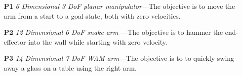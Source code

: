 \documentclass[letterpaper, 10 pt, conference]{ieeeconf}  %
\begin{document}
\begin{enumerate}
	\item[\textbf{P1}] \emph{6 Dimensional 3 DoF planar manipulator}---The objective is to move the arm from a start to a goal state, both with zero velocities.
	
	\item[\textbf{P2}] \emph{12 Dimensional 6 DoF snake arm}	---The objective is to hammer the end-effector into the wall while starting with zero velocity.

	\item[\textbf{P3}] \emph{14 Dimensional 7 DoF WAM arm}---The objective is to  to quickly swing away a glass on a table using the right arm.
\end{enumerate}
%
%
%
%
%
%
%
\end{document}
